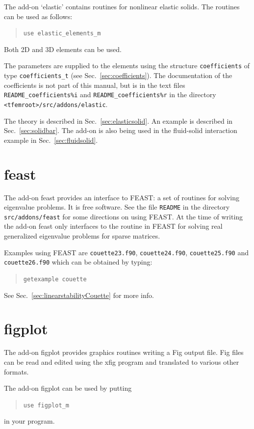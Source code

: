 The add-on `elastic' contains routines for nonlinear elastic solids. The routines
can be used as follows:
\begin{quote}
   \texttt{use elastic\_elements\_m}
\end{quote}
Both 2D and 3D elements can be used.

The parameters are
supplied to the elements using the structure \texttt{coefficients} of type
\texttt{coefficients\_t} (see Sec.~\ref{sec:coefficients}). The documentation
of the coefficients is not part of this manual, but is in the text files
\texttt{README\_coefficients\%i} and
\texttt{README\_coefficients\%r} in the directory
\texttt{<tfemroot>/src/addons/elastic}.

The theory is described in Sec.~\ref{sec:elasticsolid}.
An example is described in Sec.~\ref{sec:solidbar}. The add-on is also
being used in the fluid-solid interaction example in Sec.~\ref{sec:fluidsolid}.

\section{feast}
\label{sec:feast}

The add-on feast provides an interface to FEAST: a set of routines for solving
eigenvalue problems. It is free software. See the file \texttt{README} in the
directory \texttt{src/addons/feast} for some
directions on using FEAST. At the time of writing the add-on feast only interfaces to the routine in FEAST for solving real generalized eigenvalue problems for sparse matrices.

Examples using FEAST are
\texttt{couette23.f90}, \texttt{couette24.f90}, \texttt{couette25.f90} and \texttt{couette26.f90} which can be obtained by typing:
\begin{quote}
   \texttt{getexample couette}
\end{quote}
See Sec.~\ref{sec:linearstabilityCouette} for more info.

\section{figplot}
\label{sec:figplot}

The add-on figplot provides graphics routines writing a Fig output file. Fig files can be read and
edited using the xfig program and translated to various other formats.

The add-on figplot can be used by putting
\begin{quote}
   \texttt{use figplot\_m}
\end{quote}
in your program.


